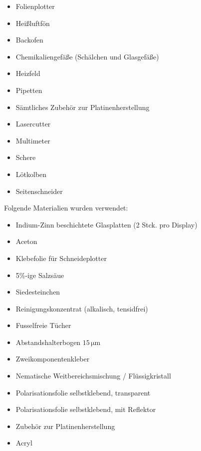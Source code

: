 \begin{itemize}
\item Folienplotter
\item Heißluftfön
\item Backofen
\item Chemikaliengefäße (Schälchen und Glasgefäße)
\item Heizfeld
\item Pipetten
\item Sämtliches Zubehör zur Platinenherstellung
\item Lasercutter
\item Multimeter
\item Schere
\item Lötkolben
\item Seitenschneider
\end{itemize}


Folgende Materialien wurden verwendet:

\begin{itemize}
\item Indium-Zinn beschichtete Glasplatten (2 Stck. pro Display)
\item Aceton
\item Klebefolie für Schneideplotter
\item 5\%-ige Salzsäue
\item Siedesteinchen
\item Reinigungskonzentrat (alkalisch, tensidfrei)
\item Fusselfreie Tücher
\item Abstandshalterbogen \(15\,\mathrm{\mu m}\)
\item Zweikomponentenkleber
\item Nematische Weitbereichsmischung / Flüssigkristall
\item Polarisationsfolie selbstklebend, transparent
\item Polarisationsfolie selbstklebend, mit Reflektor
\item Zubehör zur Platinenherstellung
\item Acryl
\end{itemize}